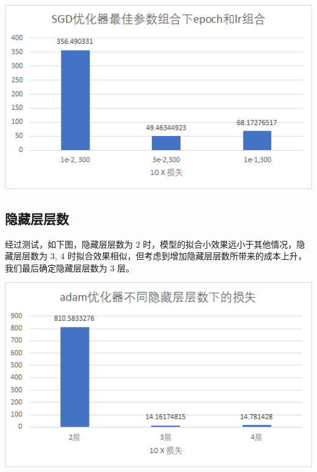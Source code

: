         \begin{minipage}{\linewidth}
            \begin{center}
                \vspace*{1em}
                \includegraphics*[width = 1\textwidth]{123.jpg}
            \end{center}
        \end{minipage} 
    \vfill
    \subsection{隐藏层层数}
        \par 经过测试，如下图，隐藏层层数为 $2$ 时，模型的拟合小效果远小于其他情况，隐藏层层数为 $3, \ 4$ 时拟合效果相似，但考虑到增加隐藏层层数所带来的成本上升，我们最后确定隐藏层层数为 $3$ 层。
        
        \begin{minipage}{\linewidth}
            \begin{center}
                \vspace*{1em}
                \includegraphics*[width = 1\textwidth]{layer_num.jpg}
            \end{center}
        \end{minipage} 

